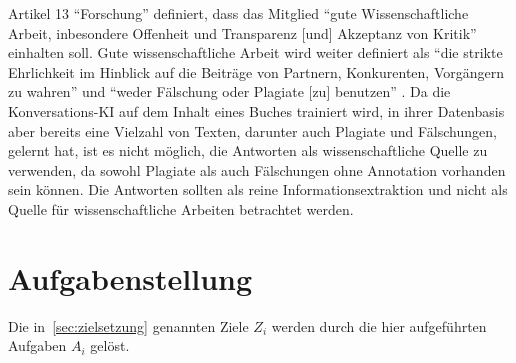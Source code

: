 Artikel 13 \enquote{Forschung} definiert, dass das Mitglied \enquote{gute Wissenschaftliche Arbeit, inbesondere Offenheit und Transparenz [und] Akzeptanz von Kritik} \citep{gmds_eth} einhalten soll.
Gute wissenschaftliche Arbeit wird weiter definiert als
\enquote{die strikte Ehrlichkeit im Hinblick auf die Beiträge von Partnern, Konkurenten, Vorgängern zu wahren} und \enquote{weder Fälschung oder Plagiate [zu] benutzen} \citep{gmds_eth}.
Da die Konversations-KI auf dem Inhalt eines Buches trainiert wird, in ihrer Datenbasis aber bereits eine Vielzahl von Texten, darunter auch Plagiate und Fälschungen, gelernt hat,
ist es nicht möglich, die Antworten als wissenschaftliche Quelle zu verwenden, da sowohl Plagiate als auch Fälschungen ohne Annotation vorhanden sein können.
Die Antworten sollten als reine Informationsextraktion und nicht als Quelle für wissenschaftliche Arbeiten betrachtet werden.

\section{Aufgabenstellung}

Die in~\ref{sec:zielsetzung} genannten Ziele $Z_i$ werden durch die hier aufgeführten Aufgaben $A_i$ gelöst.

